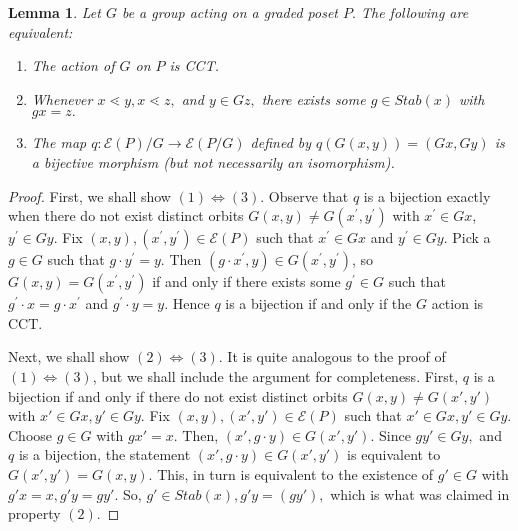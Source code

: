 \documentclass[10 pt]{amsart}
\theoremstyle{plain}
\newtheorem{lem}[thm]{Lemma}
\theoremstyle{definition}
\theoremstyle{remark}
\numberwithin{equation}{section}
\renewcommand{\iff}{\Leftrightarrow}
\begin{document}
\begin{lem}
\label{lem:cover_transitive_equivalence}
Let $G$ be a group acting on a graded poset $P.$ The following are equivalent:
\begin{enumerate}
	\item The action of $G$ on $P$ is CCT.
	\item Whenever $x \lessdot y,x \lessdot z,$ and $y \in Gz,$ there exists some $g \in Stab(x)$ with $gx = z.$
	\item The map $q\colon \mathcal E(P)/G\rightarrow \mathcal E(P/G)$ defined by $q(G(x, y)) = (Gx,Gy)$ is a bijective morphism (but not necessarily an isomorphism).
\end{enumerate}
\end{lem}
\begin{proof}
First, we shall show $(1) \iff (3)$. Observe that $q$ is a bijection exactly when there do not exist distinct orbits $G(x, y) \ne G(x^\prime, y^\prime)$ with $x^\prime\in Gx$, $y^\prime\in Gy$.  Fix $(x, y), (x^\prime, y^\prime)\in \mathcal E(P)$ such that $x^\prime\in Gx$ and $y^\prime\in Gy$.  Pick a $g\in G$ such that $g\cdot y^\prime = y$.  Then $(g\cdot x^\prime, y)\in G(x^\prime, y^\prime)$, so $G(x, y) = G(x^\prime, y^\prime)$ if and only if there exists some $g^\prime\in G$ such that $g^\prime\cdot x = g\cdot x^\prime$ and $g^\prime\cdot y = y$. Hence $q$ is a bijection if and only if the $G$ action is CCT.

Next, we shall show $(2) \iff (3)$. It is quite analogous to the proof of $(1) \iff (3)$, but we shall include the argument for completeness. 
First, $q$ is a bijection if and only if there do not exist distinct orbits $G(x, y) \neq G(x', y')$ with $x' \in Gx,y'\in Gy.$ Fix $(x, y),(x', y') \in \mathcal E(P)$ such that $x' \in Gx,y'\in Gy$. Choose $g \in G$ with $gx' = x.$ Then, $(x', g\cdot y) \in G(x', y').$ Since $g y' \in Gy,$ and $q$ is a bijection, the statement $(x' , g\cdot y) \in G(x', y')$ is equivalent to $G(x', y') = G(x, y).$ This, in turn is equivalent to the existence of $g' \in G$ with $g'x = x,g'y = gy'.$ So, $g' \in Stab(x),g'y = (gy'),$ which is what was claimed in property $(2)$.


\end{proof}
\end{document}
